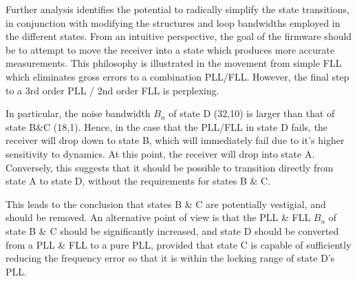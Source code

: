 Further analysis identifies the potential to radically simplify the state transitions, in conjunction with modifying the structures and loop bandwidths employed in the different states. From an intuitive perspective, the goal of the firmware should be to attempt to move the receiver into a state which produces more accurate measurements. This philosophy is illustrated in the movement from simple FLL which eliminates gross errors to a combination  PLL/FLL. However, the final step to a 3rd order PLL / 2nd order FLL is perplexing. 

In particular, the noise bandwidth $B_n$ of state D (32,10) is larger than that of state B\&C (18,1). Hence, in the case that the PLL/FLL in state D fails, the receiver will drop down to state B, which will immediately fail due to it's higher sensitivity to dynamics. At this point, the receiver will drop into state A. Conversely, this suggests that it should be possible to transition  directly from state A to state D, without the requirements for states B \& C. 

This leads to the conclusion that states B \& C are potentially vestigial, and should be removed. An alternative point of view is that the PLL \& FLL $B_n$ of state B \& C should be significantly increased, and state D should be converted from a PLL \& FLL to a pure PLL, provided that state C is capable of sufficiently reducing the frequency error so that it is within the locking range of state D's PLL.

